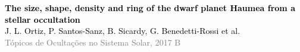 

{ %
\begin{frame}[c]%
\begin{center}



	\quad

	
	\vspace{1em}
	\normalsize\textcolor{black}{\textbf{The size, shape, density and ring of the dwarf planet Haumea from a stellar occultation}
	\texttt{}}\\
	\vspace{.5em}
	\quad
	\footnotesize\textcolor{black}{J. L. Ortiz, P. Santos-Sanz, B. Sicardy, G. Benedetti-Rossi et al.} \\
	\vspace{1.5cm}
	\footnotesize\textcolor{gray}{Tópicos de Ocultações no Sistema Solar, 2017 B}\quad

\end{center}
\end{frame}
}

